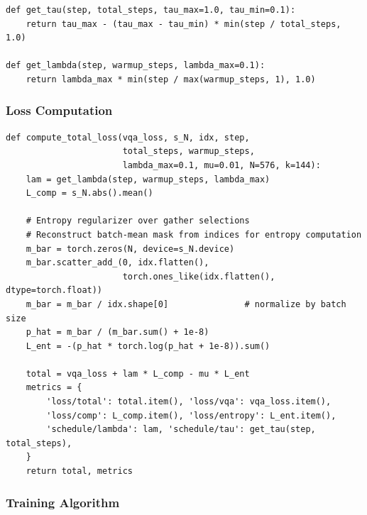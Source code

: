 \documentclass[11pt,a4paper]{article}
\begin{document}
\begin{lstlisting}[caption={Temperature and lambda schedules.}]
def get_tau(step, total_steps, tau_max=1.0, tau_min=0.1):
    return tau_max - (tau_max - tau_min) * min(step / total_steps, 1.0)

def get_lambda(step, warmup_steps, lambda_max=0.1):
    return lambda_max * min(step / max(warmup_steps, 1), 1.0)
\end{lstlisting}

\subsubsection{Loss Computation}

\begin{lstlisting}[caption={Complete TC-ViTok loss function.}]
def compute_total_loss(vqa_loss, s_N, idx, step,
                       total_steps, warmup_steps,
                       lambda_max=0.1, mu=0.01, N=576, k=144):
    lam = get_lambda(step, warmup_steps, lambda_max)
    L_comp = s_N.abs().mean()

    # Entropy regularizer over gather selections
    # Reconstruct batch-mean mask from indices for entropy computation
    m_bar = torch.zeros(N, device=s_N.device)
    m_bar.scatter_add_(0, idx.flatten(),
                       torch.ones_like(idx.flatten(), dtype=torch.float))
    m_bar = m_bar / idx.shape[0]               # normalize by batch size
    p_hat = m_bar / (m_bar.sum() + 1e-8)
    L_ent = -(p_hat * torch.log(p_hat + 1e-8)).sum()

    total = vqa_loss + lam * L_comp - mu * L_ent
    metrics = {
        'loss/total': total.item(), 'loss/vqa': vqa_loss.item(),
        'loss/comp': L_comp.item(), 'loss/entropy': L_ent.item(),
        'schedule/lambda': lam, 'schedule/tau': get_tau(step, total_steps),
    }
    return total, metrics
\end{lstlisting}

\subsubsection{Training Algorithm}
\end{document}

